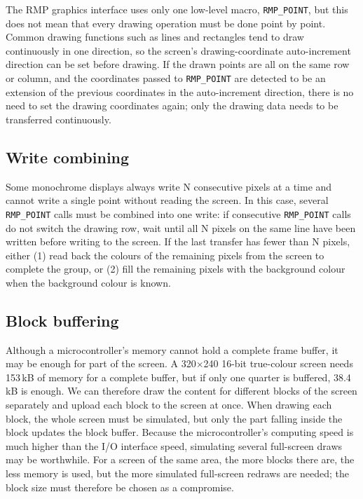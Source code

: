 The RMP graphics interface uses only one low-level macro, \texttt{RMP\_POINT}, but this does not mean that every drawing operation must be done point by point.
Common drawing functions such as lines and rectangles tend to draw continuously in one direction, so the screen's drawing-coordinate auto-increment direction can be set before drawing.
If the drawn points are all on the same row or column, and the coordinates passed to \texttt{RMP\_POINT} are detected to be an extension of the previous coordinates in the auto-increment direction, there is no need to set the drawing coordinates again; only the drawing data needs to be transferred continuously.

\subsection{Write combining}

Some monochrome displays always write N consecutive pixels at a time and cannot write a single point without reading the screen.
In this case, several \texttt{RMP\_POINT} calls must be combined into one write: if consecutive \texttt{RMP\_POINT} calls do not switch the drawing row, wait until all N pixels on the same line have been written before writing to the screen.
If the last transfer has fewer than N pixels, either (1) read back the colours of the remaining pixels from the screen to complete the group, or (2) fill the remaining pixels with the background colour when the background colour is known.

\subsection{Block buffering}

Although a microcontroller's memory cannot hold a complete frame buffer, it may be enough for part of the screen.
A 320$\times$240 16-bit true-colour screen needs 153\,kB of memory for a complete buffer, but if only one quarter is buffered, 38.4\,kB is enough.
We can therefore draw the content for different blocks of the screen separately and upload each block to the screen at once.
When drawing each block, the whole screen must be simulated, but only the part falling inside the block updates the block buffer.
Because the microcontroller's computing speed is much higher than the I/O interface speed, simulating several full-screen draws may be worthwhile.
For a screen of the same area, the more blocks there are, the less memory is used, but the more simulated full-screen redraws are needed; the block size must therefore be chosen as a compromise.


